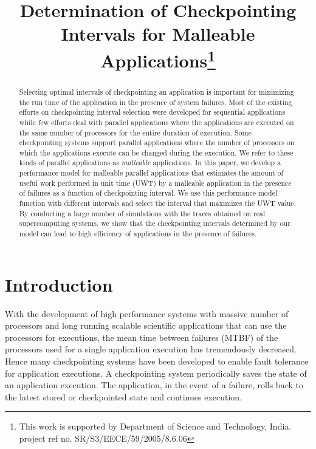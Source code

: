 \documentclass[conference,10pt]{IEEEtran}
\begin{document}
\title{Determination of Checkpointing Intervals for Malleable Applications\thanks{This work is supported by Department of Science and Technology, India. project ref no. SR/S3/EECE/59/2005/8.6.06}}
\author{
}

\maketitle

\begin{abstract}
Selecting optimal intervals of checkpointing an application is
important for minimizing the run time of the application in the
presence of system failures. Most of the existing efforts on
checkpointing interval selection were developed for sequential
applications while few efforts deal with parallel applications where
the applications are executed on the same number of processors for the
entire duration of execution. Some checkpointing systems support
parallel applications where the number of processors on which the
applications execute can be changed during the execution. We refer to
these kinds of parallel applications as {\em malleable}
applications. In this paper, we develop a performance model for
malleable parallel applications that estimates the amount of useful
work performed in unit time (UWT) by a malleable application in the
presence of failures as a function of checkpointing interval. We use
this performance model function with different intervals and select
the interval that maximizes the UWT value. By conducting a large
number of simulations with the traces obtained on real supercomputing
systems, we show that the checkpointing intervals determined by our
model can lead to high efficiency of applications in the presence of
failures.
\end{abstract}

\section{Introduction}
\label{introduction}

With the development of high performance systems with massive number
of processors\cite{top500} and long running scalable scientific
applications that can use the processors for
executions\cite{oliker-petascale-ipdps07}, the mean time between
failures (MTBF) of the processors used for a single application
execution has tremendously
decreased\cite{petrini-systemlevel-ipdps04}. Hence many checkpointing
systems have been developed to enable fault tolerance for application
executions\cite{chen-supportingdynamic-sc06,ruscio-dejavu-ipdps07,fernandez-mobilempi-ppopp06,schulz-implementation-sc04,vadhiyar-srs-ppl2003}.
A checkpointing system periodically saves the state of an application
execution. The application, in the event of a failure, rolls back to
the latest stored or checkpointed state and continues execution.
\end{document}
